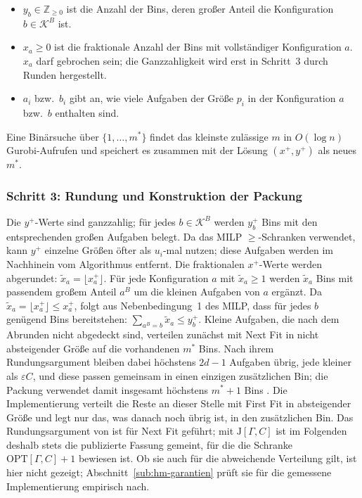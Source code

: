 \begin{itemize}
  \item $y_b \in \mathbb{Z}_{\geq 0}$ ist die Anzahl der Bins, deren großer Anteil die Konfiguration
        $b \in \mathcal{K}^B$ ist.
  \item $x_{a} \geq 0$ ist die fraktionale Anzahl der Bins mit vollständiger Konfiguration $a$.
        $x_{a}$ darf gebrochen sein; die Ganzzahligkeit wird erst in Schritt~3 durch Runden hergestellt.
  \item $a_i$ bzw.\ $b_i$ gibt an, wie viele Aufgaben der Größe $p_i$ in der Konfiguration
        $a$ bzw.\ $b$ enthalten sind.
\end{itemize}

Eine Binärsuche über $\{1, \ldots, m^*\}$ findet das kleinste zulässige $m$ in $O(\log n)$
Gurobi-Aufrufen und speichert es zusammen mit der Lösung $(x^+, y^+)$ als neues $m^*$.

\subsubsection{Schritt 3: Rundung und Konstruktion der Packung}

Die $y^+$-Werte sind ganzzahlig; für jedes $b \in \mathcal{K}^B$ werden $y^+_b$ Bins mit den
entsprechenden großen Aufgaben belegt.
Da das MILP $\geq$-Schranken verwendet, kann $y^+$ einzelne Größen öfter als $u_i$-mal nutzen;
diese Aufgaben werden im Nachhinein vom Algorithmus entfernt.
Die fraktionalen $x^+$-Werte werden abgerundet: $\tilde{x}_{a} = \lfloor x^+_{a} \rfloor$.
Für jede Konfiguration $a$ mit $\tilde{x}_{a} \geq 1$ werden $\tilde{x}_{a}$
Bins mit passendem großem Anteil $a^B$ um die kleinen Aufgaben von $a$ ergänzt.
Da $\tilde{x}_{a} = \lfloor x^+_{a} \rfloor \le x^+_{a}$, folgt aus Nebenbedingung~1 des MILP, dass für jedes $b$ genügend Bins
bereitstehen: $\sum_{a^B = b} \tilde{x}_{a} \le y^+_b$.
Kleine Aufgaben, die nach dem Abrunden nicht abgedeckt sind, verteilen
\textcite{jansen_solisoba2010} zunächst mit Next Fit in nicht absteigender Größe auf die
vorhandenen $m^*$ Bins.
Nach ihrem Rundungsargument bleiben dabei höchstens $2d - 1$ Aufgaben übrig, jede kleiner als
$\varepsilon C$, und diese passen gemeinsam in einen einzigen zusätzlichen Bin; die Packung
verwendet damit insgesamt höchstens $m^* + 1$ Bins \cite[Lemma~3.1]{jansen_solisoba2010}.
Die Implementierung verteilt die Reste an dieser Stelle mit First Fit in absteigender Größe und
legt nur das, was danach noch übrig ist, in den zusätzlichen Bin.
Das Rundungsargument von \textcite{jansen_solisoba2010} ist für Next Fit geführt; mit
$\mathrm{J}[\Gamma, C]$ ist im Folgenden deshalb stets die publizierte Fassung gemeint, für die
die Schranke $\mathrm{OPT}[\Gamma, C] + 1$ bewiesen ist.
Ob sie auch für die abweichende Verteilung gilt, ist hier nicht gezeigt;
Abschnitt~\ref{sub:hm-garantien} prüft sie für die gemessene Implementierung empirisch nach.


